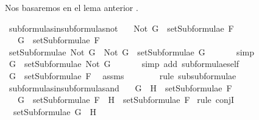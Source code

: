 \begin{isabellebody}
\begin{isamarkuptext}
  Nos basaremos en el lema anterior .%
\end{isamarkuptext}\isamarkuptrue%
\isamarkupfalse%
\ subformulas{\isacharunderscore}in{\isacharunderscore}subformulas{\isacharunderscore}not{\isacharcolon}\isanewline
\ \ \ {\isachardoublequoteopen}Not\ G\ {\isasymin}\ setSubformulae\ F{\isachardoublequoteclose}\isanewline
\ \ \ {\isachardoublequoteopen}G\ {\isasymin}\ setSubformulae\ F{\isachardoublequoteclose}\isanewline
%
\isadelimproof
%
\endisadelimproof
%
\isatagproof
{}\isamarkupfalse%
\ {\isacharminus}\isanewline
\ \ \isamarkupfalse%
\ {\isachardoublequoteopen}setSubformulae\ {\isacharparenleft}Not\ G{\isacharparenright}\ {\isacharequal}\ {\isacharbraceleft}Not\ G{\isacharbraceright}\ {\isasymunion}\ setSubformulae\ G{\isachardoublequoteclose}\ \isanewline
\ \ \ \ \isamarkupfalse%
\ simp\ %
\isanewline
\ \ \isamarkupfalse%
\ \isamarkupfalse%
\ {}{\isacharcolon}{\isachardoublequoteopen}G\ {\isasymin}\ setSubformulae\ {\isacharparenleft}Not\ G{\isacharparenright}{\isachardoublequoteclose}\ \isanewline
\ \ \ \ \isamarkupfalse%
\ {\isacharparenleft}simp\ add{\isacharcolon}\ subformulae{\isacharunderscore}self{\isacharparenright}\ %
\isanewline
\ \ \isamarkupfalse%
\ {\isachardoublequoteopen}G\ {\isasymin}\ setSubformulae\ F{\isachardoublequoteclose}\ \isamarkupfalse%
\ assms\ {}\ \isanewline
\ \ \ \ \isamarkupfalse%
\ {\isacharparenleft}rule\ subsubformulae{\isacharparenright}\isanewline
{}\isamarkupfalse%
%
\endisatagproof
{\isafoldproof}%
%
\isadelimproof
\isanewline
%
\endisadelimproof
\isanewline
{}\isamarkupfalse%
\ subformulas{\isacharunderscore}in{\isacharunderscore}subformulas{\isacharunderscore}and{\isacharcolon}\isanewline
\ \ \ {\isachardoublequoteopen}G\ \isactrlbold {\isasymand}\ H\ {\isasymin}\ setSubformulae\ F{\isachardoublequoteclose}\ \isanewline
\ \ \ {\isachardoublequoteopen}G\ {\isasymin}\ setSubformulae\ F\ {\isasymand}\ H\ {\isasymin}\ setSubformulae\ F{\isachardoublequoteclose}\isanewline
%
\isadelimproof
%
\endisadelimproof
%
\isatagproof
{}\isamarkupfalse%
\ {\isacharparenleft}rule\ conjI{\isacharparenright}\isanewline
\ \ \isamarkupfalse%
\ {}{\isacharcolon}\ {\isachardoublequoteopen}setSubformulae\ {\isacharparenleft}G\ \isactrlbold {\isasymand}\ H{\isacharparenright}\ {\isacharequal}\ \isanewline

\end{isabellebody}
